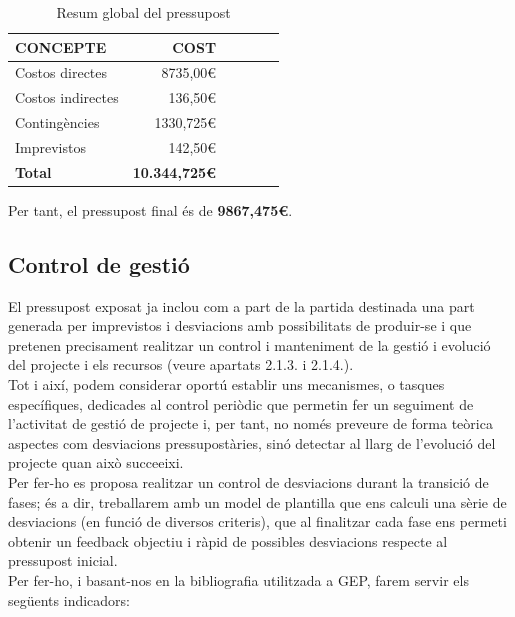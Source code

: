 \begin{table}[htb]
\centering
\label{PressupostGlobal}
\begin{tabular}{lrrrrr}
\hline \textbf{CONCEPTE}                           &  \textbf{COST} \\
\hline
Costos directes                         & 8735,00\euro \\
Costos indirectes                         & 136,50\euro \\
Contingències                        & 1330,725\euro \\
Imprevistos                         & 142,50\euro \\
\hline
\textbf{Total}    &     \textbf{10.344,725\euro}       \\
\hline                      
\end{tabular}%
\caption{Resum global del pressupost}
\end{table}

Per tant, el pressupost final és de \textbf{9867,475\euro}.

\subsection{Control de gestió}

El pressupost exposat ja inclou com a part de la partida destinada una part generada per imprevistos i desviacions amb possibilitats de produir-se i que pretenen precisament realitzar un control i manteniment de la gestió i evolució del projecte i els recursos (veure apartats 2.1.3. i 2.1.4.).\\

Tot i així, podem considerar oportú establir uns mecanismes, o tasques específiques, dedicades al control periòdic que permetin fer un seguiment de l’activitat de gestió de projecte i, per tant, no només preveure de forma teòrica aspectes com desviacions pressupostàries, sinó detectar al llarg de l’evolució del projecte quan això succeeixi.\\

Per fer-ho es proposa realitzar un control de desviacions durant la transició de fases; és a dir, treballarem amb un model de plantilla que ens calculi una sèrie de desviacions (en funció de diversos criteris), que al finalitzar cada fase ens permeti obtenir un feedback objectiu i ràpid de possibles desviacions respecte al pressupost inicial.\\

Per fer-ho, i basant-nos en la bibliografia utilitzada a GEP, farem servir els següents indicadors:

